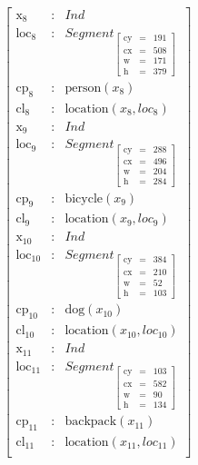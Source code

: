\documentclass[11pt, a4paper]{article}
\begin{document}
\begin{equation}\label{eq:sitmerge}
\left[\begin{array}{rcl}
\text{x}_\text{8} &:& Ind\\
\text{loc}_\text{8} &:& Segment_{\left[\begin{array}{rcl}
	\text{cy} &=& 191\\
	\text{cx} &=& 508\\
	\text{w} &=& 171\\
	\text{h} &=& 379
	\end{array}\right]}\\
\text{cp}_\text{8} &:& \text{person}(x_{8})\\
\text{cl}_\text{8} &:& \text{location}(x_{8}, loc_{8})\\
\text{x}_\text{9} &:& Ind\\
\text{loc}_\text{9} &:& Segment_{\left[\begin{array}{rcl}
	\text{cy} &=& 288\\
	\text{cx} &=& 496\\
	\text{w} &=& 204\\
	\text{h} &=& 284
	\end{array}\right]}\\
\text{cp}_\text{9} &:& \text{bicycle}(x_{9})\\
\text{cl}_\text{9} &:& \text{location}(x_{9}, loc_{9})\\
\text{x}_\text{10} &:& Ind\\
\text{loc}_\text{10} &:& Segment_{\left[\begin{array}{rcl}
	\text{cy} &=& 384\\
	\text{cx} &=& 210\\
	\text{w} &=& 52\\
	\text{h} &=& 103
	\end{array}\right]}\\
\text{cp}_\text{10} &:& \text{dog}(x_{10})\\
\text{cl}_\text{10} &:& \text{location}(x_{10}, loc_{10})\\
\text{x}_\text{11} &:& Ind\\
\text{loc}_\text{11} &:& Segment_{\left[\begin{array}{rcl}
	\text{cy} &=& 103\\
	\text{cx} &=& 582\\
	\text{w} &=& 90\\
	\text{h} &=& 134
	\end{array}\right]}\\
\text{cp}_\text{11} &:& \text{backpack}(x_{11})\\
\text{cl}_\text{11} &:& \text{location}(x_{11}, loc_{11})\\
\end{array}\right]\end{equation}
\end{document}
